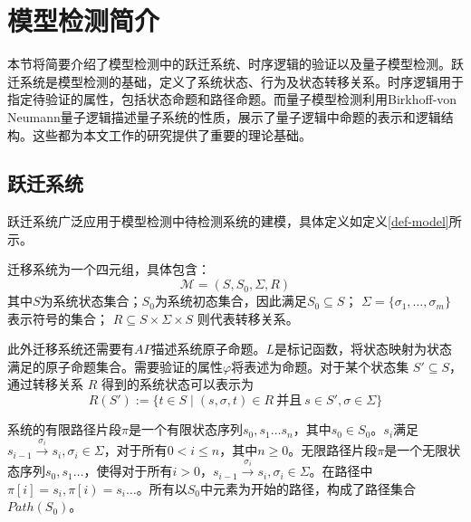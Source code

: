 \section{模型检测简介}
本节将简要介绍了模型检测中的跃迁系统、时序逻辑的验证以及量子模型检测。跃迁系统是模型检测的基础，定义了系统状态、行为及状态转移关系。时序逻辑用于指定待验证的属性，包括状态命题和路径命题。而量子模型检测利用Birkhoff-von Neumann量子逻辑描述量子系统的性质，展示了量子逻辑中命题的表示和逻辑结构。这些都为本文工作的研究提供了重要的理论基础。
\subsection{跃迁系统}
\label{sec-transition}
跃迁系统广泛应用于模型检测中待检测系统的建模，具体定义如定义\ref{def-model}所示。
\begin{definition}\citep{baier2008principles}
    \label{def-model}
    迁移系统为一个四元组，具体包含：
    \begin{equation}
        \mathcal{M}=(S, S_0, \Sigma, R)
    \end{equation}
    其中\(S\)为系统状态集合；\(S_0\)为系统初态集合，因此满足\(S_0\subseteq S\)； $\Sigma=\{\sigma_1,\ldots,\sigma_m\}$ 表示符号的集合； $R \subseteq S \times \Sigma \times S$ 则代表转移关系。
\end{definition}

此外迁移系统还需要有\(AP\)描述系统原子命题。$L$是标记函数，将状态映射为状态满足的原子命题集合。需要验证的属性\(\varphi\)将表述为命题。对于某个状态集 $S' \subseteq S$，通过转移关系 $R$ 得到的系统状态可以表示为
\begin{equation}\label{eq:image}
R(S') := \{ t\in S \mid (s, \sigma, t) \in R\ \text{并且}\ s \in S', \sigma \in \Sigma\}
\end{equation}


系统的有限路径片段\(\pi\)是一个有限状态序列\(s_0,s_1\ldots s_n\)，其中\(s_0\in S_0\)。\(s_i\)满足\(s_{i-1}\overset{\sigma_i}{\rightarrow}s_i,\sigma_i\in \Sigma\)，对于所有\(0<i\leq n\)，其中\(n\geq 0 \)。无限路径片段\(\pi\)是一个无限状态序列\(s_0,s_1\ldots\)，使得对于所有\(i>0\)，\(s_{i-1} \overset{\sigma_i}{\rightarrow}  s_i,\sigma_i\in \Sigma\)。在路径中\(\pi\left[i\right]=s_i,\pi\left[i\right)=s_i\ldots\)。所有以\(S_0\)中元素为开始的路径，构成了路径集合\(Path\left(S_0\right)\)。

